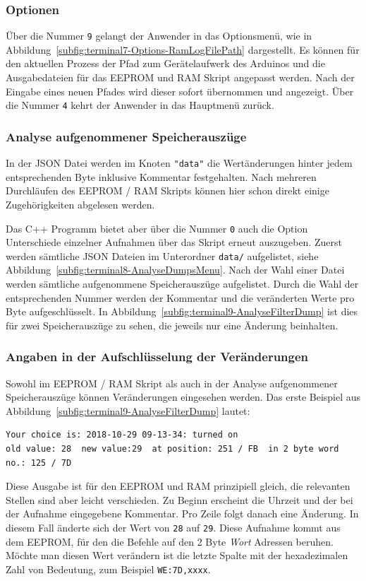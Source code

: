 \subsubsection{Optionen}
Über die Nummer \texttt{9} gelangt der Anwender in das Optionsmenü, wie in Abbildung~\ref{subfig:terminal7-Options-RamLogFilePath} dargestellt.
Es können für den aktuellen Prozess der Pfad zum Gerätelaufwerk des Arduinos und die Ausgabedateien für das \ac{EEPROM} und \ac{RAM} Skript angepasst werden.
Nach der Eingabe eines neuen Pfades wird dieser sofort übernommen und angezeigt.
Über die Nummer \texttt{4} kehrt der Anwender in das Hauptmenü zurück.

\subsubsection{Analyse aufgenommener Speicherauszüge}
In der \ac{JSON} Datei werden im Knoten \texttt{"data"} die Wertänderungen hinter jedem entsprechenden Byte inklusive Kommentar festgehalten.
Nach mehreren Durchläufen des \ac{EEPROM} / \ac{RAM} Skripts können hier schon direkt einige Zugehörigkeiten abgelesen werden.

Das C++ Programm bietet aber über die Nummer \texttt{0} auch die Option Unterschiede einzelner Aufnahmen über das Skript erneut auszugeben.
Zuerst werden sämtliche \ac{JSON} Dateien im Unterordner \texttt{data/} aufgelistet, siehe Abbildung~\ref{subfig:terminal8-AnalyseDumpsMenu}.
Nach der Wahl einer Datei werden sämtliche aufgenommene Speicherauszüge aufgelistet.
Durch die Wahl der entsprechenden Nummer werden der Kommentar und die veränderten Werte pro Byte aufgeschlüsselt.
In Abbildung~\ref{subfig:terminal9-AnalyseFilterDump} ist dies für zwei Speicherauszüge zu sehen, die jeweils nur eine Änderung beinhalten.

\subsubsection{Angaben in der Aufschlüsselung der Veränderungen}
Sowohl im \ac{EEPROM} / \ac{RAM} Skript als auch in der Analyse aufgenommener Speicherauszüge können Veränderungen eingesehen werden.
Das erste Beispiel aus Abbildung~\ref{subfig:terminal9-AnalyseFilterDump} lautet:
\begin{lstlisting}[label=lst:dumpChanges,caption={Beispiel einer Abweichung zweier Speicherauszüge}]
Your choice is: 2018-10-29 09-13-34: turned on
old value: 28  new value:29  at position: 251 / FB  in 2 byte word no.: 125 / 7D
\end{lstlisting}
Diese Ausgabe ist für den \ac{EEPROM} und \ac{RAM} prinzipiell gleich, die relevanten Stellen sind aber leicht verschieden.
Zu Beginn erscheint die Uhrzeit und der bei der Aufnahme eingegebene Kommentar.
Pro Zeile folgt danach eine Änderung.
In diesem Fall änderte sich der Wert von \texttt{28} auf \texttt{29}.
Diese Aufnahme kommt aus dem \ac{EEPROM}, für den die Befehle auf den 2 Byte \textit{Wort} Adressen beruhen.
Möchte man diesen Wert verändern ist die letzte Spalte mit der hexadezimalen Zahl von Bedeutung, zum Beispiel \texttt{WE:7D,xxxx}.

